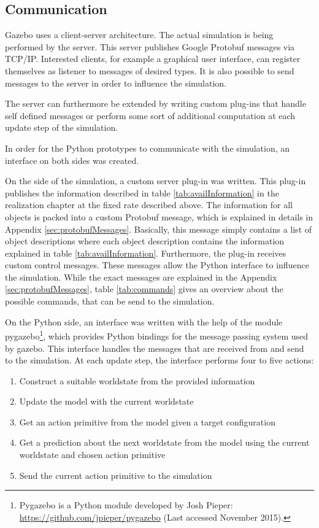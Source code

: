 \subsection{Communication}
Gazebo uses a client-server architecture. The actual simulation is being performed by the server.
This server publishes Google Protobuf \cite{protobuf} messages via TCP/IP. Interested clients, for example a graphical user interface, can register themselves as listener to messages of desired types. 
It is also possible to send messages to the server in order to influence the simulation. 

The server can furthermore be extended by writing custom plug-ins that handle self defined messages or perform some sort of additional computation at each update step of the simulation. 

In order for the Python prototypes to communicate with the simulation, an interface on both sides was created.

On the side of the simulation, a custom server plug-in was written. This plug-in publishes the information described in table \ref{tab:availInformation} in the realization chapter at the fixed rate described above. 
The information for all objects is packed into a custom Protobuf message, which is explained in details in Appendix \ref{sec:protobufMessages}. Basically, this message simply contains a list of object descriptions where each object description contains the information explained in table \ref{tab:availInformation}.
Furthermore, the plug-in receives custom control messages. These messages allow the Python interface to influence the simulation.
While the exact messages are explained in the Appendix \ref{sec:protobufMessages}, table \ref{tab:commands} gives an overview about the possible commands, that can be send to the simulation.

On the Python side, an interface was written with the help of the module  pygazebo\footnote{Pygazebo is a Python module developed by Josh Pieper: \url{https://github.com/jpieper/pygazebo} (Last accessed November 2015).}, which provides Python bindings for the message passing system used by gazebo. This interface handles the messages that are received from and send to the simulation. 
At each update step, the interface performs four to five actions:
\begin{enumerate}
\item Construct a suitable worldstate from the provided information
\item Update the model with the current worldstate
\item Get an action primitive from the model given a target configuration
\item Get a prediction about the next worldstate from the model using the current worldstate and chosen action primitive
\item Send the current action primitive to the simulation
\end{enumerate}

